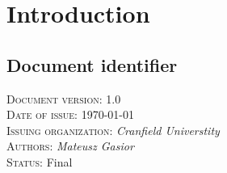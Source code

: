 \chapter{Introduction} \label{chp:introduction}
	\begin{comment}
		Introduce the following subordinate sections. This section identifies the issuing organization and the
		details of issuance. It includes required approvals and status (DRAFT/FINAL) of the document. It is
		here that the scope is described and references identified.
	\end{comment}

\section{Document identifier} \label{s:introduction:document-identifier}
	\begin{comment}
		Uniquely identify a version of the document by including information such as the date of issue, the
		issuing organization, the author(s), the approval signatures (possibly electronic), and the status/version
		(e.g., draft, reviewed, corrected, or final). Identifying information may also include the reviewers and
		pertinent managers. This information is commonly put on an early page in the document, such as the
		cover page or the pages immediately following it. Some organizations put this information at the end
		of the document. This information may also be kept in a place other than in the text of the document
		(e.g., in the configuration management system or in the header or footer of the document).
	\end{comment}
	\textsc{Document version: } 1.0 \\
	\textsc{Date of issue:} \today \\
	\textsc{Issuing organization:} \textit{Cranfield Universtity} \\
	\textsc{Authors: } \textit{Mateusz Gasior} \\
	\textsc{Status: } Final \\
